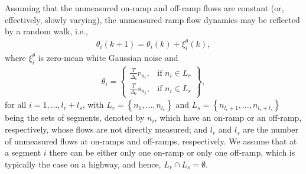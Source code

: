 \documentclass[titlepage,oneside,fleqn,12pt]{article}
\begin{document}
Assuming that the unmeasured on-ramp and off-ramp flows are constant (or, effectively, slowly varying), the unmeasured ramp flow dynamics may be reflected by a random walk, i.e., 
\begin{eqnarray}
\theta_i(k+1)=\theta_i(k)+\xi_i^{\theta}(k),\label{thetai}
\end{eqnarray}
 where $\xi_i^{\theta}$ is zero-mean white Gaussian noise and 
 \begin{eqnarray}
 \theta_i=\left\{\begin{array}{ll}\frac{T}{\Delta_i}r_{n_i},&\mbox{if $n_i\in L_r$}\\\frac{T}{\Delta_i}s_{n_i},&\mbox{if $n_i\in L_s$}\end{array}\right\},
\end{eqnarray} 
for all $i=1,\ldots,l_r+l_s$, with $L_r=\left\{n_1,\ldots,n_{l_r}\right\}$ and $L_s=\left\{n_{l_r+1},\ldots,n_{l_r+l_s}\right\}$ being the sets of segments, denoted by $n_i$, which have an on-ramp or an off-ramp, respectively, whose flows are not directly measured; and $l_r$ and $l_s$ are the number of unmeasured flows at on-ramps and off-ramps, respectively. We assume that at a segment $i$ there can be either only one on-ramp or only one off-ramp, which is typically the case on a highway, and hence, $L_r\cap L_s=\emptyset$.
\end{document}
